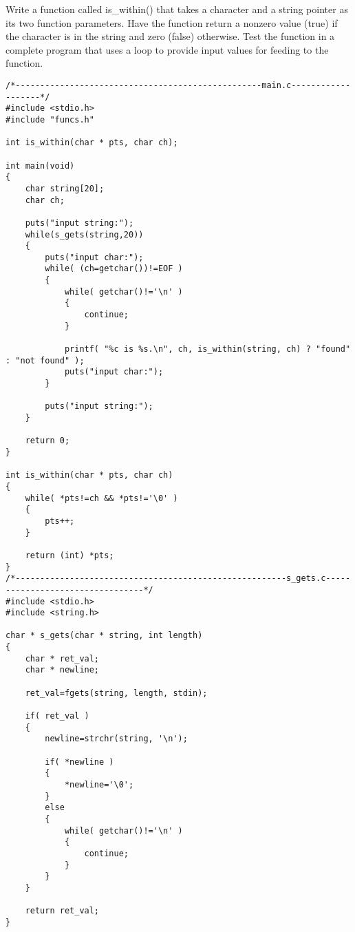 \begin{question}
Write a function called is_within() that takes a character and a string pointer as its two
function parameters. Have the function return a nonzero value (true) if the character is
in the string and zero (false) otherwise. Test the function in a complete program that uses
a loop to provide input values for feeding to the function.
\end{question}
\begin{solution}
  \begin{verbatim}
/*--------------------------------------------------main.c-------------------*/
#include <stdio.h>
#include "funcs.h"

int is_within(char * pts, char ch);

int main(void)
{
	char string[20];
	char ch;

	puts("input string:");
	while(s_gets(string,20))
	{
		puts("input char:");
		while( (ch=getchar())!=EOF )
		{
			while( getchar()!='\n' )
			{
				continue;
			}

			printf( "%c is %s.\n", ch, is_within(string, ch) ? "found" : "not found" );
			puts("input char:");
		}

		puts("input string:");
	}

	return 0;
}

int is_within(char * pts, char ch)
{
	while( *pts!=ch && *pts!='\0' )
	{
		pts++;
	}

	return (int) *pts;
}
/*-------------------------------------------------------s_gets.c---------------------------------*/
#include <stdio.h>
#include <string.h>

char * s_gets(char * string, int length)
{
	char * ret_val;
	char * newline;

	ret_val=fgets(string, length, stdin);

	if( ret_val )
	{
		newline=strchr(string, '\n');

		if( *newline )
		{
			*newline='\0';
		}
		else
		{
			while( getchar()!='\n' )
			{
				continue;
			}
		}
	}

	return ret_val;
}
  \end{verbatim}
\end{solution}

